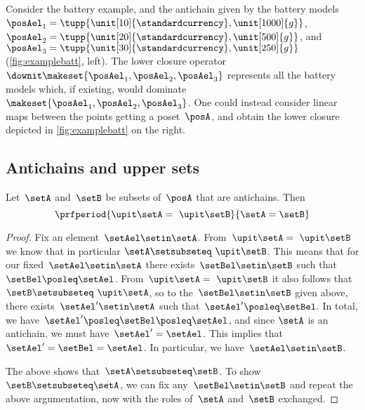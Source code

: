 Consider the battery example, and the antichain given by the battery models~$\posAel_1=\tupp{\unit[10]{\standardcurrency},\unit[1000]{g}}$,~$\posAel_2=\tupp{\unit[20]{\standardcurrency},\unit[500]{g}}$, and~$\posAel_3=\tupp{\unit[30]{\standardcurrency},\unit[250]{g}}$ (\cref{fig:examplebatt}, left).
The lower closure operator~$\downit\makeset{\posAel_1,\posAel_2,\posAel_3}$ represents all the battery models which, if existing, would dominate~$\makeset{\posAel_1,\posAel_2,\posAel_3}$.
One could instead consider linear maps between the points getting a poset~$\posA$, and obtain the lower closure depicted in \cref{fig:examplebatt} on the right.

\begin{figure*}[h!]
    \centering
    \hfill
    \hfill
    \caption{Example of lower closures.}
    \label{fig:examplebatt}
\end{figure*}

\subsection{Antichains and upper sets}

\begin{lemma}
    \label{lem:up-cl-inj-antichains}
    Let~$\setA$ and~$\setB$ be subsets of~$\posA$ that are antichains.
    Then
    \begin{equation*}
        \prfperiod{\upit  \setA = \ \upit  \setB}{\setA = \setB}
    \end{equation*}
\end{lemma}

\begin{proof}
    Fix an element~$\setAel \setin \setA$.
    From~$\upit  \setA = \ \upit  \setB$ we know that in particular $\setA \setsubseteq \ \upit  \setB$.
    This means that for our fixed~$\setAel \setin \setA$ there exists~$\setBel \setin \setB$ such that~$\setBel \posleq \setAel$.
    From~$\upit \setA = \ \upit  \setB$ it also follows that~$\setB \setsubseteq \ \upit  \setA$, so to the~$\setBel \setin \setB$ given above, there exists~$\setAel' \setin \setA$ such that~$\setAel' \posleq \setBel$.
    In total, we have~$\setAel' \posleq \setBel \posleq \setAel$, and since $\setA$ is an antichain, we must have~$\setAel' = \setAel$.
    This implies that~$\setAel' = \setBel = \setAel$.
    In particular, we have~$\setAel \setin \setB$.

    The above shows that~$\setA \setsubseteq \setB$.
    To show~$\setB \setsubseteq \setA$, we can fix any~$\setBel \setin \setB$ and repeat the above argumentation, now with the roles of~$\setA$ and~$\setB$ exchanged.
\end{proof}

